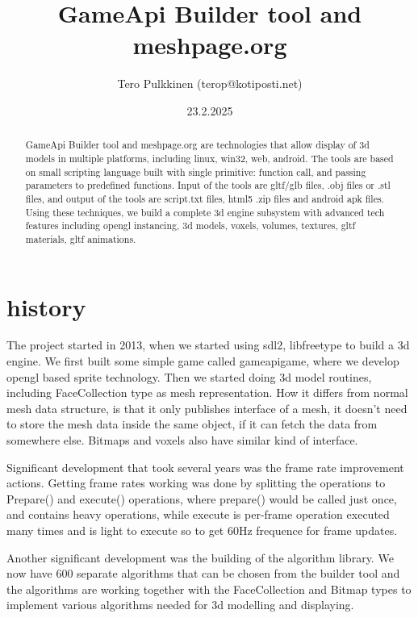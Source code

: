 \documentclass[11pt,twoside,a4paper]{article}
\begin{document}
\title{GameApi Builder tool and meshpage.org}
\author{Tero Pulkkinen (terop@kotiposti.net)}
\date{23.2.2025}
\maketitle
\newcommand{\code}[1]{\lstinline{#1}}
\begin{abstract}
  GameApi Builder tool and meshpage.org are technologies that allow display of 3d models in multiple platforms, including linux, win32, web, android. The tools are based on small scripting language built with single primitive: function call, and passing parameters to predefined functions. Input of the tools are gltf/glb files, .obj files or .stl files, and output of the tools are script.txt files, html5 .zip files and android apk files. Using these techniques, we build a complete 3d engine subsystem with advanced tech features including opengl instancing, 3d models, voxels, volumes, textures, gltf materials, gltf animations.
\end{abstract}

\section{history}

The project started in 2013, when we started using sdl2, libfreetype
to build a 3d engine. We first built some simple game called
gameapigame, where we develop opengl based sprite technology. Then we
started doing 3d model routines, including FaceCollection type as mesh
representation. How it differs from normal mesh data structure, is
that it only publishes interface of a mesh, it doesn't need to store
the mesh data inside the same object, if it can fetch the data from
somewhere else. Bitmaps and voxels also have similar kind of
interface.

Significant development that took several years was the frame rate
improvement actions. Getting frame rates working was done by splitting
the operations to Prepare() and execute() operations, where prepare()
would be called just once, and contains heavy operations, while
execute is per-frame operation executed many times and is light to
execute so to get 60Hz frequence for frame updates.

Another significant development was the building of the algorithm
library. We now have 600 separate algorithms that can be chosen from
the builder tool and the algorithms are working together with the
FaceCollection and Bitmap types to implement various algorithms needed
for 3d modelling and displaying.
\end{document}
